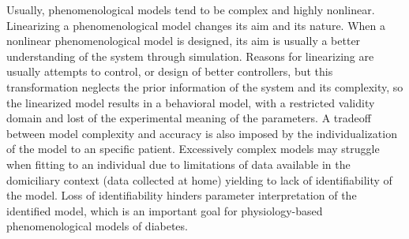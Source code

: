 Usually, phenomenological models tend to be complex and highly nonlinear. Linearizing a phenomenological model changes its aim and its nature. When a nonlinear phenomenological model is designed, its aim is usually a better understanding of the system through simulation. Reasons for linearizing are usually attempts to control, or design of better controllers, but this transformation neglects the prior information of the system and its complexity, so the linearized model results in a behavioral model, with a restricted validity domain and lost of the experimental meaning of the parameters. A tradeoff between model complexity and accuracy is also imposed by the individualization of the model to an specific patient. Excessively complex models may struggle when fitting to an individual due to limitations of data available in the domiciliary context (data collected at home) yielding to lack of identifiability of the model. Loss of identifiability hinders parameter interpretation of the identified model, which is an important goal for physiology-based phenomenological models of diabetes.

